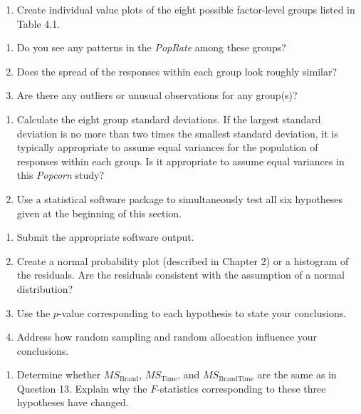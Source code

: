 \documentclass[
]{book}
\providecommand{\tightlist}{%
  \setlength{\itemsep}{0pt}\setlength{\parskip}{0pt}}
\begin{document}
\begin{enumerate}
\def\labelenumi{\arabic{enumi}.}
\setcounter{enumi}{15}
\tightlist
\item
  Create individual value plots of the eight possible factor-level groups listed in Table 4.1.
\end{enumerate}

\begin{enumerate}
\def\labelenumi{\alph{enumi}.}
\tightlist
\item
  Do you see any patterns in the \emph{PopRate} among these groups?
\item
  Does the spread of the responses within each group look roughly similar?
\item
  Are there any outliers or unusual observations for any group(s)?
\end{enumerate}

\begin{enumerate}
\def\labelenumi{\arabic{enumi}.}
\setcounter{enumi}{16}
\tightlist
\item
  Calculate the eight group standard deviations. If the largest standard deviation is no more than two times the smallest standard deviation, it is typically appropriate to assume equal variances for the population of responses within each group. Is it appropriate to assume equal variances in this \emph{Popcorn} study?
\item
  Use a statistical software package to simultaneously test all six hypotheses given at the beginning of this section.
\end{enumerate}

\begin{enumerate}
\def\labelenumi{\alph{enumi}.}
\tightlist
\item
  Submit the appropriate software output.
\item
  Create a normal probability plot (described in Chapter 2) or a histogram of the residuals. Are the residuals consistent with the assumption of a normal distribution?
\item
  Use the \(p\)-value corresponding to each hypothesis to state your conclusions.
\item
  Address how random sampling and random allocation influence your conclusions.
\end{enumerate}

\begin{enumerate}
\def\labelenumi{\arabic{enumi}.}
\setcounter{enumi}{18}
\tightlist
\item
  Determine whether \(MS_{\text{Brand}}\), \(MS_{\text{Time}}\), and \(MS_{\text{BrandTime}}\) are the same as in Question 13. Explain why the \(F\)-statistics corresponding to these three hypotheses have changed.
\end{enumerate}
\end{document}

